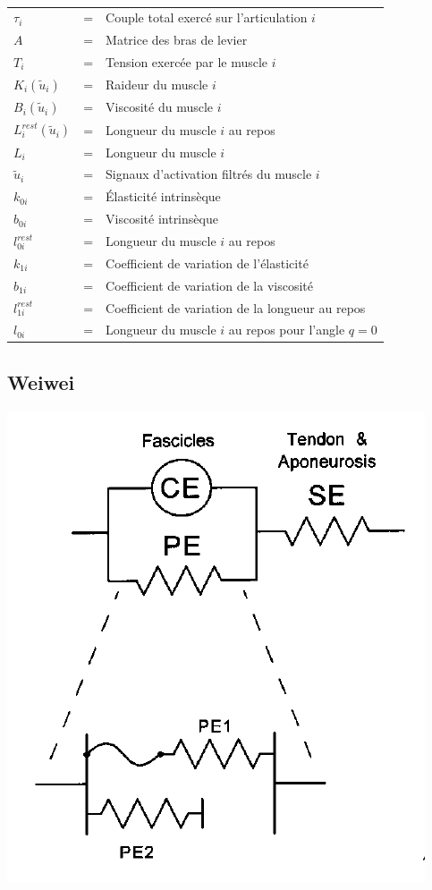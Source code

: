 \documentclass[pdftex,a4paper,11pt]{article}
\begin{document}
\paragraph{}
\begin{tabular}{lcl}
    $\tau_i$ & = & Couple total exercé sur l'articulation $i$ \\
    $A$  & = & Matrice des bras de levier \\
    $T_i$  & = & Tension exercée par le muscle $i$ \\
    $K_i(\tilde{u}_i)$ & = & Raideur du muscle $i$ \\
    $B_i(\tilde{u}_i)$ & = & Viscosité du muscle $i$ \\
    $L_i^{rest}(\tilde{u}_i)$ & = & Longueur du muscle $i$ au repos \\
    $L_i$ & = & Longueur du muscle $i$ \\
    $\tilde{u}_i$ & = & Signaux d'activation filtrés du muscle $i$ \\
    $k_{0i}$ & = & Élasticité intrinsèque \\
    $b_{0i}$ & = & Viscosité intrinsèque \\
    $l^{rest}_{0i}$ & = & Longueur du muscle $i$ au repos \\
    $k_{1i}$ & = & Coefficient de variation de l'élasticité \\
    $b_{1i}$ & = & Coefficient de variation de la viscosité \\
    $l^{rest}_{1i}$ & = & Coefficient de variation de la longueur au repos \\
    $l_{0i}$ & = & Longueur du muscle $i$ au repos pour l'angle $q = 0$ \\
\end{tabular}


\subsection{Weiwei}

\begin{center}
        \includegraphics[width=.40\linewidth]{fig/brown}
\end{center}
\end{document}
